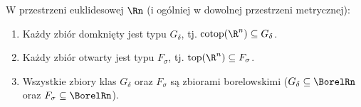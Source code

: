 \begin{wn} W przestrzeni euklidesowej $\Rn$ (i ogólniej w dowolnej przestrzeni metrycznej):
    \begin{enumerate}
        \item Każdy zbiór domknięty jest typu $G_\delta$, tj. $\mathrm{cotop}(\R^n) \subseteq  G_\delta$.
        \item Każdy zbiór otwarty jest typu $F_\sigma$, tj. $\mathrm{top}(\R^n) \subseteq  F_\sigma$.
        \item Wszystkie zbiory klas $G_\delta$ oraz $F_\sigma$ są zbiorami borelowskimi ($G_\delta \subseteq  \BorelRn$ oraz $F_\sigma \subseteq  \BorelRn$).
    \end{enumerate}
\end{wn}
